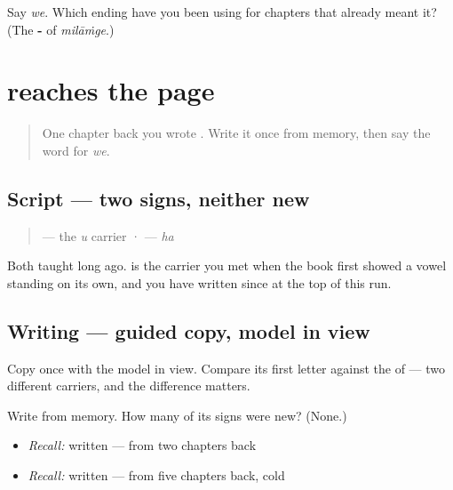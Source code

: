 \begin{tcolorbox}[breakable,colback=teal!4,colframe=teal!35!black,title={Before you move on}]
Say \emph{we}. Which ending have you been using for chapters that already meant it? (The \textbf{-} of \emph{milāṁge}.)
\end{tcolorbox}
\section[\texorpdfstring{\pa{ਉਹ} (oh)}{ਉਹ (oh)}]{ reaches the page}

\label{lesson:PA-C42-oh-write}



\begin{quote}
One chapter back you wrote \textbf{}. Write it once from memory, then say the word for \emph{we}.
\end{quote}

\subsection*{Script — two signs, neither new}
\begin{quote}
\textbf{} — the \emph{u} carrier · \textbf{} — \emph{ha}
\end{quote}

Both taught long ago. \textbf{} is the carrier you met when the book first showed a vowel standing on its own, and \textbf{} you have written since \textbf{} at the top of this run.

\subsection*{Writing — guided copy, model in view}
Copy \textbf{} once with the model in view. Compare its first letter against the \textbf{} of \textbf{} — two different carriers, and the difference matters.

\begin{tcolorbox}[breakable,colback=teal!4,colframe=teal!35!black,title={Before you move on}]
Write \textbf{} from memory. How many of its signs were new? (None.)

\begin{itemize}
\raggedright
  \item \emph{Recall:} \textbf{} written — from two chapters back
  \item \emph{Recall:} \textbf{} written — from five chapters back, cold
\end{itemize}
\end{tcolorbox}
